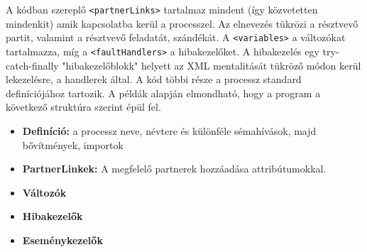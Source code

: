  A kódban szereplő \texttt{<partnerLinks>} tartalmaz mindent (így közvetetten mindenkit) amik kapcsolatba kerül a processzel. Az elnevezés tükrözi a résztvevő partit, valamint a résztvevő feladatát, szándékát. A \texttt{<variables>} a változókat tartalmazza, míg a \texttt{<faultHandlers>} a hibakezelőket. A hibakezelés egy try-catch-finally "hibakezelőblokk" helyett az XML mentalitását tükröző módon kerül lekezelésre, a handlerek által. A kód többi része a processz standard definíciójához tartozik. A példák alapján elmondható, hogy a program a következő struktúra szerint épül fel.
\begin{itemize}
\item \textbf{Definíció: } a processz neve, névtere és különféle sémahívások, majd bővítmények, importok
\item \textbf{PartnerLinkek: } A megfelelő partnerek hozzáadása attribútumokkal. 
\item \textbf{Változók}
\item \textbf{Hibakezelők}
\item\textbf{Eseménykezelők}
\end{itemize}
